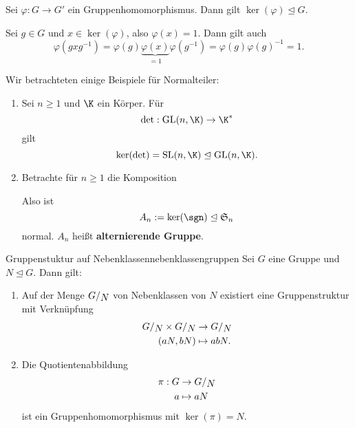 \begin{satz}{}{}
Sei $\varphi: G \to G'$ ein Gruppenhomomorphismus. Dann gilt $\ker (\varphi) \trianglelefteq G$.
\end{satz}
\begin{beweis}
Sei $g \in G$ und $x \in \ker (\varphi)$, also $\varphi (x) = 1$. Dann gilt auch 
\begin{equation}
\varphi (gxg^{-1}) = \varphi(g)\underbrace{\varphi(x)}_{=1}\varphi(g^{-1}) = \varphi(g)\varphi(g)^{-1} = 1.
\end{equation}
\end{beweis}
\begin{beispiele}
Wir betrachteten einige Beispiele für Normalteiler:
\begin{enumerate}
\item Sei $n \geq 1$ und $\K$ ein Körper. Für 
\begin{equation}
\det: \text{GL}(n,\K) \to \K^\ast
\end{equation}
gilt
\begin{equation}
\ker (\det) = \text{SL}(n, \K) \trianglelefteq \text{GL}(n,\K).
\end{equation}
\item Betrachte für $n \geq 1$ die Komposition
\begin{center}
\end{center}
Also ist 
\begin{equation}
A_n := \ker (\sgn) \trianglelefteq \mathfrak{S}_n
\end{equation}
normal. $A_n$ heißt \textbf{alternierende Gruppe}.
\end{enumerate}
\end{beispiele}
\begin{satz}{Gruppenstuktur auf Nebenklassen}{nebenklassengruppen}
Sei $G$ eine Gruppe und $N \trianglelefteq G$. Dann gilt:
\begin{enumerate}
\item Auf der Menge $\quotient{G}{N}$ von Nebenklassen von $N$ existiert eine Gruppenstruktur mit Verknüpfung
\begin{align}
\quotient{G}{N} \times \quotient{G}{N} &\to \quotient{G}{N} \\
(aN, bN) &\mapsto abN.
\end{align}
\item Die Quotientenabbildung
\begin{align}
\pi: G &\to \quotient{G}{N}\\
a &\mapsto aN
\end{align}
ist ein Gruppenhomomorphismus mit $\ker (\pi) = N$.
\end{enumerate}
\end{satz}
